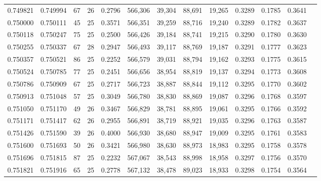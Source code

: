 \begin{tabular}{rrrrrrrrrrrrr}
0.749821 & 0.749994 &    67 &  26 &                                     0.2796 & 566,306 &  39,304 &  88,691 &  19,265 & 0.3289 & 0.1785 & 0.3641 \\
0.750000 & 0.750111 &    45 &  25 &                                     0.3571 & 566,351 &  39,259 &  88,716 &  19,240 & 0.3289 & 0.1782 & 0.3637 \\
0.750118 & 0.750247 &    75 &  25 &                                     0.2500 & 566,426 &  39,184 &  88,741 &  19,215 & 0.3290 & 0.1780 & 0.3630 \\
0.750255 & 0.750337 &    67 &  28 &                                     0.2947 & 566,493 &  39,117 &  88,769 &  19,187 & 0.3291 & 0.1777 & 0.3623 \\
0.750357 & 0.750521 &    86 &  25 &                                     0.2252 & 566,579 &  39,031 &  88,794 &  19,162 & 0.3293 & 0.1775 & 0.3615 \\
0.750524 & 0.750785 &    77 &  25 &                                     0.2451 & 566,656 &  38,954 &  88,819 &  19,137 & 0.3294 & 0.1773 & 0.3608 \\
0.750786 & 0.750909 &    67 &  25 &                                     0.2717 & 566,723 &  38,887 &  88,844 &  19,112 & 0.3295 & 0.1770 & 0.3602 \\
0.750913 & 0.751048 &    57 &  25 &                                     0.3049 & 566,780 &  38,830 &  88,869 &  19,087 & 0.3296 & 0.1768 & 0.3597 \\
0.751050 & 0.751170 &    49 &  26 &                                     0.3467 & 566,829 &  38,781 &  88,895 &  19,061 & 0.3295 & 0.1766 & 0.3592 \\
0.751171 & 0.751417 &    62 &  26 &                                     0.2955 & 566,891 &  38,719 &  88,921 &  19,035 & 0.3296 & 0.1763 & 0.3587 \\
0.751426 & 0.751590 &    39 &  26 &                                     0.4000 & 566,930 &  38,680 &  88,947 &  19,009 & 0.3295 & 0.1761 & 0.3583 \\
0.751600 & 0.751693 &    50 &  26 &                                     0.3421 & 566,980 &  38,630 &  88,973 &  18,983 & 0.3295 & 0.1758 & 0.3578 \\
0.751696 & 0.751815 &    87 &  25 &                                     0.2232 & 567,067 &  38,543 &  88,998 &  18,958 & 0.3297 & 0.1756 & 0.3570 \\
0.751821 & 0.751916 &    65 &  25 &                                     0.2778 & 567,132 &  38,478 &  89,023 &  18,933 & 0.3298 & 0.1754 & 0.3564 \\

\end{tabular}
